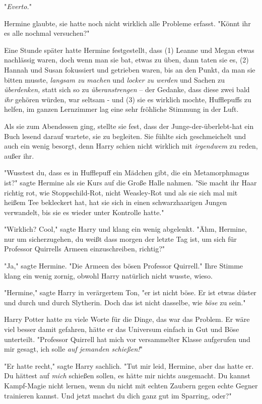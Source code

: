{"\emph{Everto.}"

Hermine glaubte, sie hatte noch nicht wirklich alle Probleme erfasst. "Könnt ihr es alle nochmal versuchen?"

Eine Stunde später hatte Hermine festgestellt, dass (1) Leanne und Megan etwas nachlässig waren, doch wenn man sie bat, etwas zu üben, dann taten sie es, (2) Hannah und Susan fokussiert und getrieben waren, bis an den Punkt, da man sie bitten musste, \emph{langsam zu machen} und \emph{locker zu werden} und Sachen zu \emph{überdenken,} statt sich so zu \emph{überanstrengen} -- der Gedanke, dass diese zwei bald \emph{ihr} gehören würden, war seltsam - und (3) sie es wirklich mochte, Hufflepuffs zu helfen, im ganzen Lernzimmer lag eine sehr fröhliche Stimmung in der Luft.

Als sie zum Abendessen ging, stellte sie fest, dass der Junge-der-überlebt-hat ein Buch lesend darauf wartete, sie zu begleiten. Sie fühlte sich geschmeichelt und auch ein wenig besorgt, denn Harry schien nicht wirklich mit \emph{irgendwem} zu reden, außer ihr.

"Wusstest du, dass es in Hufflepuff ein Mädchen gibt, die ein Metamorphmagus ist?" sagte Hermine als sie Kurs auf die Große Halle nahmen. "Sie macht ihr Haar richtig rot, wie Stoppschild-Rot, nicht Weasley-Rot und als sie sich mal mit heißem Tee bekleckert hat, hat sie sich in einen schwarzhaarigen Jungen verwandelt, bis sie es wieder unter Kontrolle hatte."

"Wirklich? Cool," sagte Harry und klang ein wenig abgelenkt. "Ähm, Hermine, nur um sicherzugehen, du weißt dass morgen der letzte Tag ist, um sich für Professor Quirrells Armeen einzuschreiben, richtig?"

"Ja," sagte Hermine. "Die Armeen des bösen Professor Quirrell." Ihre Stimme klang ein wenig zornig, obwohl Harry natürlich nicht wusste, wieso.

"Hermine," sagte Harry in verärgertem Ton, "er ist nicht böse. Er ist etwas düster und durch und durch Slytherin. Doch das ist nicht dasselbe, wie \emph{böse} zu sein."

Harry Potter hatte zu viele Worte für die Dinge, das war das Problem. Er wäre viel besser damit gefahren, hätte er das Universum einfach in Gut und Böse unterteilt. "Professor Quirrell hat mich vor versammelter Klasse aufgerufen und mir gesagt, ich solle \emph{auf jemanden schießen!}"

"Er hatte recht," sagte Harry sachlich. "Tut mir leid, Hermine, aber das hatte er. Du hättest auf \emph{mich} schießen sollen, es hätte mir nichts ausgemacht. Du kannst Kampf-Magie nicht lernen, wenn du nicht mit echten Zaubern gegen echte Gegner trainieren kannst. Und jetzt machst du dich ganz gut im Sparring, oder?"

}
